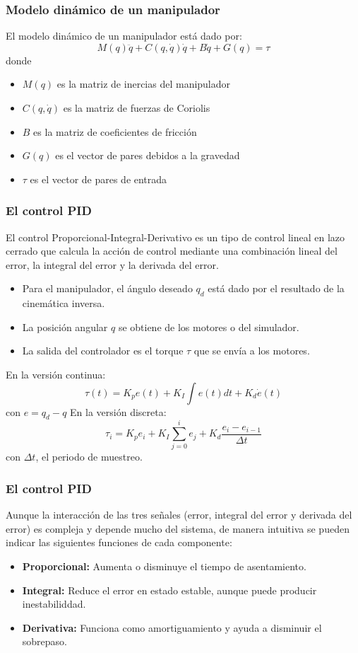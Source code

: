 \begin{frame}\frametitle{Modelo dinámico de un manipulador}
  El modelo dinámico de un manipulador está dado por:
  \[M(q)\ddot{q} + C(q,\dot{q})\dot{q} + B\dot{q} + G(q) = \tau\]
  donde
  \begin{itemize}
  \item $M(q)$ es la matriz de inercias del manipulador
  \item $C(q,\dot{q})$ es la matriz de fuerzas de Coriolis
  \item $B$ es la matriz de coeficientes de fricción
  \item $G(q)$ es el vector de pares debidos a la gravedad
  \item $\tau$ es el vector de pares de entrada
  \end{itemize}
\end{frame}

\begin{frame}\frametitle{El control PID}
  El control Proporcional-Integral-Derivativo es un tipo de control lineal en lazo cerrado que calcula la acción de control mediante una combinación lineal del error, la integral del error y la derivada del error.
  \begin{itemize}
  \item Para el manipulador, el ángulo deseado $q_d$ está dado por el resultado de la cinemática inversa. 
  \item La posición angular $q$ se obtiene de los motores o del simulador.
  \item La salida del controlador es el torque $\tau$ que se envía a los motores.
  \end{itemize}
  En la versión continua:
  \[\tau(t) = K_p e(t) + K_I \int e(t)dt + K_d \dot{e}(t)\]
  con $e = q_d - q$
  En la versión discreta:
  \[\tau_i = K_p e_i + K_I\sum_{j=0}^i e_j + K_d\frac{e_i - e_{i-1}}{\Delta t}\]
  con $\Delta t$, el periodo de muestreo. 
\end{frame}

\begin{frame}\frametitle{El control PID}
  Aunque la interacción de las tres señales (error, integral del error y derivada del error) es compleja y depende mucho del sistema, de manera intuitiva se pueden indicar las siguientes funciones de cada componente:
  \begin{itemize}
  \item \textbf{Proporcional:} Aumenta o disminuye el tiempo de asentamiento.
  \item \textbf{Integral:} Reduce el error en estado estable, aunque puede producir inestabiliddad.
  \item \textbf{Derivativa:} Funciona como amortiguamiento y ayuda a disminuir el sobrepaso. 
  \end{itemize}
\end{frame}


